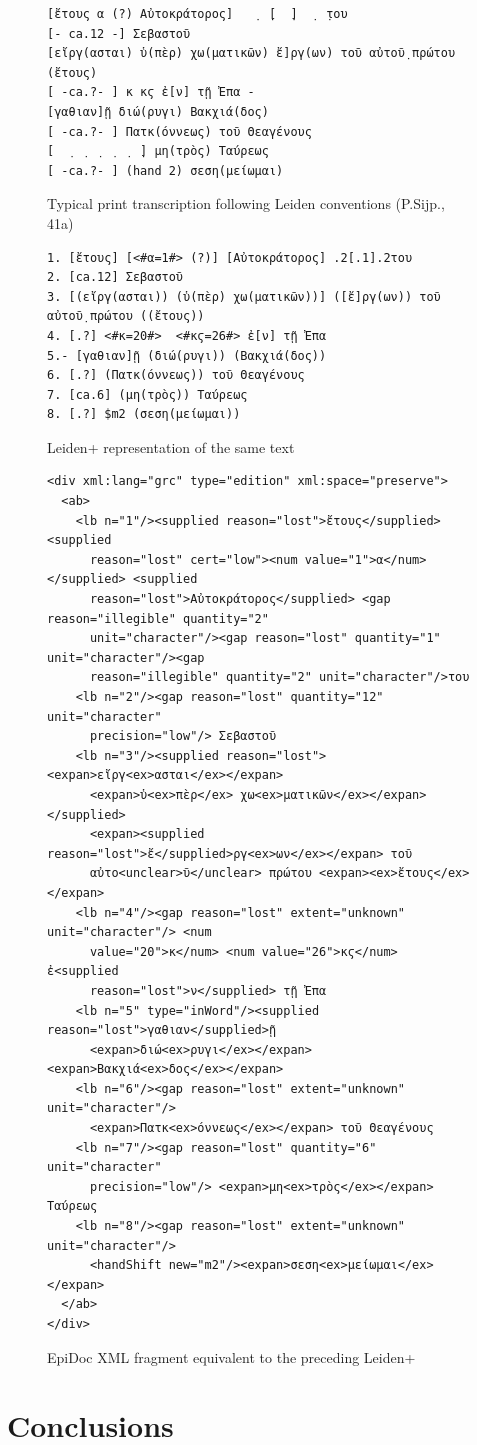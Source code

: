 \documentclass[]{article}
\begin{document}
\begin{figure}[!ht]
    \begin{verbatim}
[ἔτους α (?) Αὐτοκράτορος]   ̣  ̣[  ̣]  ̣  ̣του 
[- ca.12 -] Σεβαστοῦ 
[εἴργ(ασται) ὑ(πὲρ) χω(ματικῶν) ἔ]ργ(ων) τοῦ αὐτοῦ̣ πρώτου (ἔτους) 
[ -ca.?- ] κ κϛ ἐ[ν] τῇ Ἐπα -
[γαθιαν]ῇ διώ(ρυγι) Βακχιά(δος) 
[ -ca.?- ] Πατκ(όννεως) τοῦ Θεαγένους 
[  ̣  ̣  ̣  ̣  ̣  ̣] μη(τρὸς) Ταύρεως 
[ -ca.?- ] (hand 2) σεση(μείωμαι)
    \end{verbatim}
    \caption{Typical print transcription following Leiden conventions (P.Sijp., 41a)\label{leiden}}
\end{figure}\nocite{psijp}

\begin{figure}[!h]
    \begin{verbatim}
1. [ἔτους] [<#α=1#> (?)] [Αὐτοκράτορος] .2[.1].2του
2. [ca.12] Σεβαστοῦ
3. [(εἴργ(ασται)) (ὑ(πὲρ) χω(ματικῶν))] ([ἔ]ργ(ων)) τοῦ αὐτοῦ̣ πρώτου ((ἔτους))
4. [.?] <#κ=20#>  <#κϛ=26#> ἐ[ν] τῇ Ἐπα
5.- [γαθιαν]ῇ (διώ(ρυγι)) (Βακχιά(δος))
6. [.?] (Πατκ(όννεως)) τοῦ Θεαγένους
7. [ca.6] (μη(τρὸς)) Ταύρεως
8. [.?] $m2 (σεση(μείωμαι))
    \end{verbatim}
    \caption{Leiden+ representation of the same text\label{leidenp}}
\end{figure}

\begin{figure}[!hb]
  \begin{verbatim}
<div xml:lang="grc" type="edition" xml:space="preserve">
  <ab>
    <lb n="1"/><supplied reason="lost">ἔτους</supplied> <supplied
      reason="lost" cert="low"><num value="1">α</num> </supplied> <supplied
      reason="lost">Αὐτοκράτορος</supplied> <gap reason="illegible" quantity="2"
      unit="character"/><gap reason="lost" quantity="1" unit="character"/><gap
      reason="illegible" quantity="2" unit="character"/>του
    <lb n="2"/><gap reason="lost" quantity="12" unit="character"
      precision="low"/> Σεβαστοῦ
    <lb n="3"/><supplied reason="lost"><expan>εἴργ<ex>ασται</ex></expan>
      <expan>ὑ<ex>πὲρ</ex> χω<ex>ματικῶν</ex></expan></supplied>
      <expan><supplied reason="lost">ἔ</supplied>ργ<ex>ων</ex></expan> τοῦ
      αὐτο<unclear>ῦ</unclear> πρώτου <expan><ex>ἔτους</ex></expan>
    <lb n="4"/><gap reason="lost" extent="unknown" unit="character"/> <num
      value="20">κ</num> <num value="26">κϛ</num> ἐ<supplied
      reason="lost">ν</supplied> τῇ Ἐπα
    <lb n="5" type="inWord"/><supplied reason="lost">γαθιαν</supplied>ῇ
      <expan>διώ<ex>ρυγι</ex></expan> <expan>Βακχιά<ex>δος</ex></expan>
    <lb n="6"/><gap reason="lost" extent="unknown" unit="character"/>
      <expan>Πατκ<ex>όννεως</ex></expan> τοῦ Θεαγένους
    <lb n="7"/><gap reason="lost" quantity="6" unit="character"
      precision="low"/> <expan>μη<ex>τρὸς</ex></expan> Ταύρεως
    <lb n="8"/><gap reason="lost" extent="unknown" unit="character"/>
      <handShift new="m2"/><expan>σεση<ex>μείωμαι</ex></expan>
  </ab>
</div>
  \end{verbatim}
  \caption{EpiDoc XML fragment equivalent to the preceding Leiden+\label{epidoc}}
\end{figure}




\section*{Conclusions}



\end{document}
